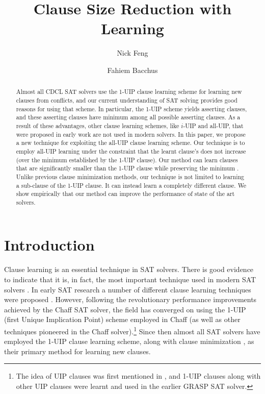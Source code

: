 \documentclass[runningheads]{llncs}
\title{Clause Size Reduction with \alluip Learning}
\author{Nick Feng \and Fahiem Bacchus}
\institute{Department of Computer Science, University of Toronto, Canada, 
  \email{\{fengnick,fbacchus\}@cs.toronto.edu}}
\newcommand{\sat}{SAT\xspace}
\newcommand{\oneuip}{1-UIP\xspace}
\newcommand{\alluip}{all-UIP\xspace}
\newcommand{\LBD}{\text{LBD}\xspace}
\begin{document}
\maketitle              %
% 
\begin{abstract}
    Almost all CDCL \sat solvers use the \oneuip 
    clause learning scheme for learning new clauses from conflicts, 
    and our current understanding
    of \sat solving provides good reasons for using that scheme. In
    particular, the \oneuip scheme yields asserting clauses, and these
    asserting clauses have minimum \LBD among all possible asserting
    clauses. As a result of these advantages, other clause learning
    schemes, like $i$-UIP and \alluip, that were proposed in early
    work are not used in modern solvers. In this paper, we propose a
    new technique for exploiting the \alluip clause learning scheme. 
    Our technique is to employ \alluip learning under the
    constraint that the learnt clause's \LBD does not increase (over the
    minimum established by the \oneuip clause). Our method can learn
    clauses that are significantly smaller than the \oneuip clause while
    preserving the minimum \LBD. Unlike previous clause minimization
    methods, our technique is not limited to learning a sub-clause of
    the \oneuip clause. It can instead learn a completely different
    clause. We show empirically 
    that our method can improve the performance of state of the art solvers.
\end{abstract}

\section{Introduction}
Clause learning is an essential technique in \sat solvers. There is
good evidence to indicate that it is, in fact, the most important
technique used in modern \sat solvers
\cite{DBLP:conf/sat/KatebiSS11}. In early \sat research a number of
different clause learning techniques were proposed
\cite{DBLP:conf/iccad/ZhangMMM01,DBLP:conf/iccad/SilvaS96,DBLP:journals/tc/Marques-SilvaS99,DBLP:conf/aaai/BayardoS97}.
However, following the revolutionary performance improvements achieved
by the Chaff \sat solver, the field has converged on using the \oneuip
(first Unique Implication Point) scheme
\cite{DBLP:conf/iccad/ZhangMMM01} employed in Chaff
\cite{DBLP:conf/dac/MoskewiczMZZM01} (as well as other techniques
pioneered in the Chaff solver).\footnote{The idea of UIP clauses was
  first mentioned in \cite{DBLP:conf/iccad/SilvaS96}, and
  \oneuip clauses along with other UIP clauses were learnt and used in
  the earlier GRASP \sat solver.} Since then almost all \sat solvers
have employed the \oneuip clause learning scheme, along with clause
minimization \cite{DBLP:conf/sat/SorenssonB09}, as their primary
method for learning new clauses.
\end{document}
